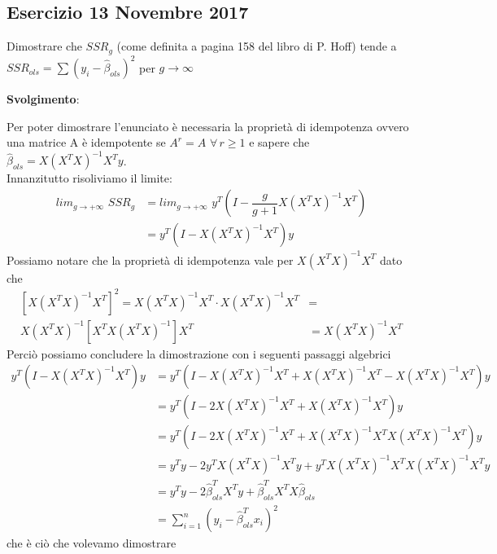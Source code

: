 \newcommand{\betaols}{\hat{\beta}_{ols}}

\subsection{Esercizio 13 Novembre 2017}
Dimostrare che $SSR_g$ (come definita a pagina 158 del libro di P. Hoff) tende a $SSR_{ols} = \sum(y_i - \betaols)^2$ per $g \rightarrow \infty$

\textbf{Svolgimento}:
\bigskip

Per poter dimostrare l'enunciato è necessaria la proprietà di idempotenza ovvero una matrice A è idempotente se $A^r = A \,\, \forall\, r \geqslant 1$ e sapere che $\betaols = X \left(X^T X \right)^{-1} X^T y$.\\
Innanzitutto risoliviamo il limite:
\begin{align*}
	lim_{g \rightarrow + \infty }\,\, SSR_g & = 	lim_{g \rightarrow + \infty } \,\, y^T \left(I - \dfrac{g}{g+1}  X \left(X^T X \right)^{-1} X^T \right) \\
	                                        & = y^T \left(I - X \left(X^T X \right)^{-1} X^T \right) y
\end{align*}
Possiamo notare che la proprietà di idempotenza vale per $X \left(X^T X \right)^{-1} X^T$ dato che
\begin{align*}
	\left[X \left(X^T X \right)^{-1} X^T\right]^2 = X \left(X^T X \right)^{-1} X^T \cdot X \left(X^T X \right)^{-1} X^T & = \\ X \left(X^T X \right)^{-1} \left[ X^T  X \left(X^T X \right)^{-1} \right] X^T  &=  X \left(X^T X \right)^{-1} X^T
\end{align*}
Perciò possiamo concludere la dimostrazione con i seguenti passaggi algebrici
\begin{align*}
	y^T \left(I - X \left(X^T X \right)^{-1} X^T \right) y & = y^T \left(I - X \left(X^T X \right)^{-1} X^T + X \left(X^T X \right)^{-1} X^T  - X \left(X^T X \right)^{-1} X^T \right) y \\ &= y^T \left(I - 2 X \left(X^T X \right)^{-1} X^T + X \left(X^T X \right)^{-1} X^T \right) y \\ &= y^T \left(I - 2 X \left(X^T X \right)^{-1} X^T + X \left(X^T X \right)^{-1} X^T X \left(X^T X \right)^{-1} X^T \right) y \\ &=
	y^Ty - 2 y^T X \left(X^T X \right)^{-1} X^T y + y^T X \left(X^T X \right)^{-1} X^T X \left(X^T X \right)^{-1} X^T y                                                                  \\ &=
	y^Ty - 2 \betaols^T X^T  y + \betaols^T X^T X \betaols                                                                                                                               \\ &= \sum_{i=1}^{n}(y_i - \betaols^T x_i)^2
\end{align*}
che è ciò che volevamo dimostrare